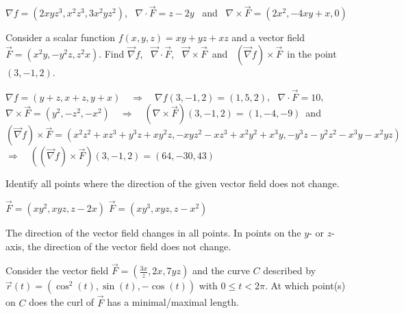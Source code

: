 \begin{Answer}
    $ \nabla f  = (2xyz^3, x^2 z^3, 3x^2yz^2)$, \, $\nabla  \cdot \vec F = z-2y$ \, and \, $ \nabla \times \vec F = (2x^2, -4xy+x,0)$
\end{Answer}

\begin{Exercise}[difficulty = 2] Consider a scalar function $f(x,y,z)=xy+yz+xz$ and a vector field $\vec F = (x^2y, -y^2z, z^2x)$. Find $ \vec{\nabla} f$, \, $ \vec{\nabla}  \cdot \vec F$, \, $ \vec{\nabla} \times \vec F $\, and \, $(\vec{\nabla} f) \times \vec F $\, in the point $(3,-1,2)$.
\end{Exercise}

\begin{Answer}
    $ \nabla f  = (y+z, x+z, y+x) \quad \Rightarrow \quad \nabla f(3,-1,2)  = (1, 5, 2)$, \,    $\nabla  \cdot \vec F = 10$,\\[0.2cm] 
$ \nabla \times \vec F = (y^2, -z^2,-x^2) \quad \Rightarrow \quad (\nabla \times \vec F)(3,-1,2) = (1,-4,-9)$\, and \\[0.2cm] $(\vec \nabla f) \times \vec F = (x^2 z^2+xz^3+y^3z+xy^2z, -xyz^2-xz^3+x^2y^2+x^3y,-y^3z-y^2z^2-x^3y-x^2yz) $ \\[0.2cm] 
$\Rightarrow \quad ((\vec \nabla f) \times \vec F)(3,-1,2) = (64,-30,43)  $
\end{Answer}

\begin{Exercise} Identify all  points where the direction of the given vector field does not change. %
\begin{multicols}{2}
		\Question[difficulty = 1] $\vec F = (xy^2, xyz, z-2x)$
		\Question[difficulty = 2] $\vec F = (xy^3, xyz, z-x^2)$
		\EndCurrentQuestion
\end{multicols}
\end{Exercise}

\begin{Answer}
    
        \Question 
        The direction of the vector field changes in all points.
        \Question 
        In points on the $y$- or  $z$-axis, the direction of the vector field does not change.
    
\end{Answer}

\begin{Exercise}[difficulty = 2] Consider the vector field $\vec F = \left(\frac{3x}{z}, 2x, 7yz \right)$ and the curve $C$ described by $\vec r(t) = (\cos^2(t), \sin (t), -\cos(t))$ with $0 \leq t < 2 \pi$. At which point(s) on $C$ does the curl of $\vec F$ has a minimal/maximal length.
\end{Exercise}

